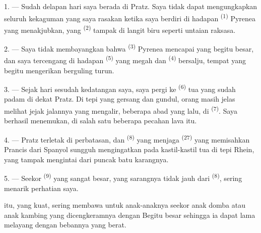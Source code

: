 \VUsaut{4.0mm}
\VUsaut{3.0mm}

\VUsaut{3.0mm}

\VUsaut{3.0mm}

1. --- Sudah delapan hari saya berada di Pratz. Saya tidak dapat
mengungkapkan seluruh kekaguman yang saya rasakan ketika saya berdiri
di hadapan  \textsuperscript{(1)} Pyrenea yang
menakjubkan, yang  \textsuperscript{(2)} tampak di
langit biru seperti untaian raksasa.

2. --- Saya tidak membayangkan bahwa 
\textsuperscript{(3)} Pyrenea mencapai  yang begitu
besar, dan saya tercengang di hadapan 
\textsuperscript{(5)} yang megah dan 
\textsuperscript{(4)} bersalju, tempat  yang
begitu mengerikan berguling turun.

\VUsaut{3.0mm}
\VUsaut{3.0mm}

3. --- Sejak hari sesudah kedatangan saya, saya pergi ke
 \textsuperscript{(6)} tua yang sudah padam di
dekat Pratz. Di tepi  yang gersang dan gundul, orang
masih jelas melihat jejak jalannya  yang mengalir,
beberapa abad yang lalu, di 
\textsuperscript{(7)}. Saya berhasil menemukan, di salah satu
 beberapa pecahan lava itu.

4. --- Pratz terletak di perbatasan, dan 
\textsuperscript{(8)} yang menjaga 
\textsuperscript{(27)} yang memisahkan Prancis dari Spanyol sungguh
mengingatkan pada kastil-kastil tua di tepi Rhein, yang tampak
mengintai  dari puncak batu karangnya.

5. --- Seekor  \textsuperscript{(9)} yang sangat besar,
yang sarangnya tidak jauh dari  \textsuperscript{(8)},
sering menarik perhatian saya.

 itu, yang  kuat, sering
membawa untuk anak-anaknya seekor anak domba atau anak kambing yang
dicengkeramnya dengan  Begitu besar 
sehingga ia dapat lama melayang dengan bebannya yang berat.

